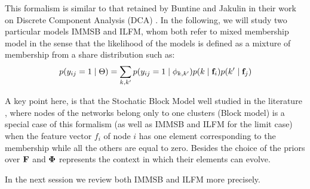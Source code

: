This formalism is similar to that retained by Buntine and Jakulin in their work on Discrete Component Analysis (DCA) \cite{DCA}. In the following,  we will study two particular models IMMSB and ILFM, whom both refer to mixed membership model in the sense that the likelihood of the models is defined as a mixture of membership from a share distribution such as:
\begin{equation}
p(y_{ij}=1 \mid \Theta ) = \sum_{k, k'} p(y_{ij}=1\mid\phi_{k,k'}) p(k \mid \mathbf{f}_i) p(k' \mid \mathbf{f}_j)
\end{equation}

A key point here, is that the Stochatic Block Model well studied in the literature \cite{goldenberg2010survey}, where nodes of the networks belong only to one clusters (Block model) is a special case of this formalism (as well as IMMSB and ILFM for the limit case) when the feature vector $f_i$ of node $i$ has one element corresponding to the membership while all the others are equal to zero. Besides the choice of the priors over $\mathbf{F}$ and $\mathbf{\Phi}$ represents the context in which  their elements can evolve.

In the next session we review both IMMSB and ILFM more precisely.

